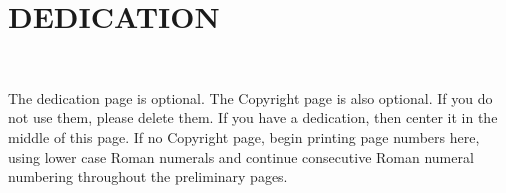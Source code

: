 
\chapter*{DEDICATION}
\hspace{1em} \vspace{17em} \\ %
\begin{center}
The dedication page is optional. The Copyright page is also optional. If you do not use them, please delete them. If you have a dedication, then center it in the middle of this page. If no Copyright page, begin printing page numbers here, using lower case Roman numerals and continue consecutive Roman numeral numbering throughout the preliminary pages.
\end{center}
 